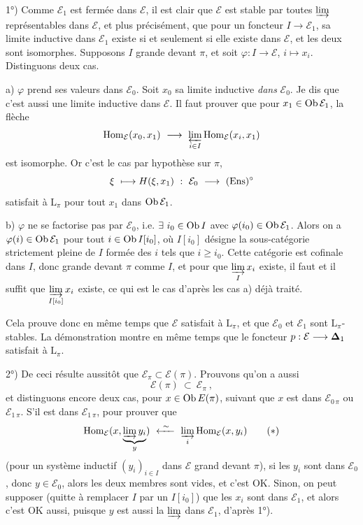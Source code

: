 1°) Comme $\mathcal{E}_1$ est fermée dans $\mathcal{E}$, il est clair que $\mathcal{E}$ est stable par toutes $\varinjlim$ représentables dans $\mathcal{E}$, et plus précisément, que pour un foncteur $I\longrightarrow\mathcal{E}_1$, sa limite inductive dans $\mathcal{E}_1$ existe si et seulement si elle existe dans $\mathcal{E}$, et les deux sont isomorphes. Supposons $I$ grande devant $\pi$, et soit $\varphi:I\longrightarrow\mathcal{E}$, $i\longmapsto x_i$. Distinguons deux cas.

a) $\varphi$ prend ses valeurs dans $\mathcal{E}_0$. Soit $x_0$ sa limite inductive \textit{dans} $\mathcal{E}_0$. Je dis que c'est aussi une limite inductive dans $\mathcal{E}$. Il faut prouver que pour $x_1\in\operatorname{Ob}\mathcal{E}_1$, la flèche
\[
\Hom_{\mathcal{E}}(x_0,x_1)\ \longrightarrow\ \varprojlim_{i\in I}\Hom_{\mathcal{E}}(x_i,x_1)
\]
est isomorphe. Or c'est le cas
par hypothèse sur $\pi$,
\[
\xi\ \longmapsto H(\xi,x_1)\ :\ \mathcal{E}_0\ \longrightarrow\ (\Ens)^{\circ}
\]
satisfait à $\mathrm{L}_\pi$ pour tout $x_1$ dans $\operatorname{Ob}\mathcal{E}_1$.

b) $\varphi$ ne se factorise pas par $\mathcal{E}_0$, i.e. $\exists\ i_0\in\operatorname{Ob} I$ avec $\varphi(i_0)\in\operatorname{Ob}\mathcal{E}_1$. Alors on a $\varphi(i)\in\operatorname{Ob}\mathcal{E}_1$ pour tout $i\in\operatorname{Ob} I[i_0]$, où $I[i_0]$ désigne la sous-catégorie strictement pleine de $I$ formée des $i$ tels que $i\geqslant i_0$. Cette catégorie est cofinale dans $I$, donc grande devant $\pi$ comme $I$, et pour que $\varinjlim\limits_{I}x_i$ existe, il faut et il suffit que $\varinjlim\limits_{I[i_0]}x_i$ existe, ce qui est le cas d'après les cas a) déjà traité. %

Cela prouve donc en même temps que $\mathcal{E}$ satisfait à $\mathrm{L}_\pi$, et que $\mathcal{E}_0$ et $\mathcal{E}_1$ sont $\mathrm{L}_\pi$-stables. La démonstration montre en même temps que le foncteur $p:\mathcal{E}\longrightarrow\boldsymbol{\Delta}_1$ satisfait à $\mathrm{L}_\pi$.

2°) De ceci résulte aussitôt que $\mathcal{E}_\pi\subset\mathcal{E}(\pi)$. Prouvons qu'on a aussi
\[
\mathcal{E}(\pi)\ \subset\ \mathcal{E}_\pi\ ,
\]
et distinguons encore deux cas, pour
$x\in\operatorname{Ob} E(\pi)$, suivant que $x$ est dans $\mathcal{E}_{0\,\pi}$ ou $\mathcal{E}_{1\,\pi}$. S'il est dans $\mathcal{E}_{1\,\pi}$, pour prouver que %
\[
\Hom_{\mathcal{E}}(x,\underbrace{\varinjlim y_i}_{y})\ \xleftarrow{\ \sim\ }\ \varinjlim_{i}\Hom_{\mathcal{E}}(x,y_i)
\tag*{$(*)$}
\]
(pour un système inductif $(y_i)_{i\in I}$ dans $\mathcal{E}$ grand devant $\pi$), si les $y_i$ sont dans $\mathcal{E}_0$, donc $y\in\mathcal{E}_0$, alors les deux membres sont vides, et c'est OK. Sinon, on peut supposer (quitte à remplacer $I$ par un $I[i_0]$) que les $x_i$ sont dans $\mathcal{E}_1$, et alors c'est OK aussi, puisque $y$ est aussi la $\varinjlim$ dans $\mathcal{E}_1$, d'après 1°). %

